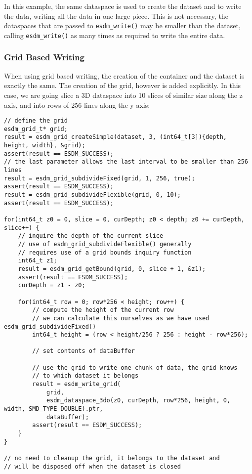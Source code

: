 In this example, the same dataspace is used to create the dataset and to write the data, writing all the data in one large piece. 
This is not necessary, the dataspaces that are passed to \lstinline|esdm_write()| may be smaller than the dataset, calling \lstinline|esdm_write()| as many times as required to write the entire data.

\subsubsection{Grid Based Writing}
When using grid based writing, the creation of the container and the dataset is exactly the same. 
The creation of the grid, however is added explicitly. 
In this case, we are going slice a 3D dataspace into 10 slices of similar size along the z axis, and into rows of 256 lines along the y axis:

\begin{lstlisting}
// define the grid
esdm_grid_t* grid;
result = esdm_grid_createSimple(dataset, 3, (int64_t[3]){depth, height, width}, &grid);
assert(result == ESDM_SUCCESS);
// the last parameter allows the last interval to be smaller than 256 lines
result = esdm_grid_subdivideFixed(grid, 1, 256, true);  
assert(result == ESDM_SUCCESS);
result = esdm_grid_subdivideFlexible(grid, 0, 10);
assert(result == ESDM_SUCCESS);

for(int64_t z0 = 0, slice = 0, curDepth; z0 < depth; z0 += curDepth, slice++) {
    // inquire the depth of the current slice
    // use of esdm_grid_subdivideFlexible() generally 
    // requires use of a grid bounds inquiry function
    int64_t z1;
    result = esdm_grid_getBound(grid, 0, slice + 1, &z1);
    assert(result == ESDM_SUCCESS);
    curDepth = z1 - z0;

    for(int64_t row = 0; row*256 < height; row++) {
        // compute the height of the current row
        // we can calculate this ourselves as we have used esdm_grid_subdivideFixed()
        int64_t height = (row < height/256 ? 256 : height - row*256);

        // set contents of dataBuffer

        // use the grid to write one chunk of data, the grid knows 
        // to which dataset it belongs
        result = esdm_write_grid(
            grid, 
            esdm_dataspace_3do(z0, curDepth, row*256, height, 0, width, SMD_TYPE_DOUBLE).ptr, 
            dataBuffer);
        assert(result == ESDM_SUCCESS);
    }
}

// no need to cleanup the grid, it belongs to the dataset and 
// will be disposed off when the dataset is closed
\end{lstlisting}

